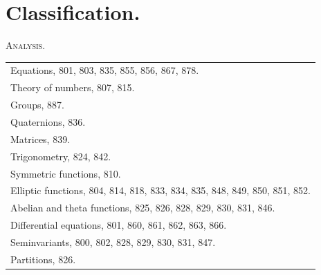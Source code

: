 \documentclass[11pt,a4paper]{article}
\theoremstyle{definition}
\theoremstyle{remark}
\begin{document}
\section*{Classification.}

\begin{center}
\textsc{Analysis.}
\end{center}
\begin{center}
\begin{tabular}{p{12cm}}
Equations, 801, 803, 835, 855, 856, 867, 878.\\
Theory of numbers, 807, 815.\\
Groups, 887.\\
Quaternions, 836.\\
Matrices, 839.\\
Trigonometry, 824, 842.\\
Symmetric functions, 810.\\
Elliptic functions, 804, 814, 818, 833, 834, 835, 848, 849, 850, 851, 852.\\
Abelian and theta functions, 825, 826, 828, 829, 830, 831, 846.\\
Differential equations, 801, 860, 861, 862, 863, 866.\\
Seminvariants, 800, 802, 828, 829, 830, 831, 847.\\
Partitions, 826.\\
\end{tabular}
\end{center}
\end{document}
